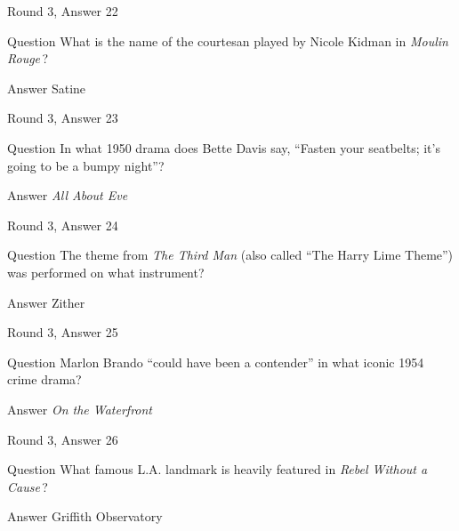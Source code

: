 \documentclass[11pt]{beamer}
\begin{document}
\begin{frame}[t]{Round 3, Answer 22}
\vspace{2em}
\begin{block}{Question}
What is the name of the courtesan played by Nicole Kidman in \emph{Moulin Rouge}\,?
\end{block}
\pause{}
\begin{block}{Answer}
Satine
\end{block}
\end{frame}
    

\begin{frame}[t]{Round 3, Answer 23}
\vspace{2em}
\begin{block}{Question}
In what 1950 drama does Bette Davis say, ``Fasten your seatbelts; it's going to be a bumpy night''?
\end{block}
\pause{}
\begin{block}{Answer}
\emph{All About Eve}
\end{block}
\end{frame}
    

\begin{frame}[t]{Round 3, Answer 24}
\vspace{2em}
\begin{block}{Question}
The theme from \emph{The Third Man} (also called ``The Harry Lime Theme'') was performed on what instrument?
\end{block}
\pause{}
\begin{block}{Answer}
Zither
\end{block}
\end{frame}
    

\begin{frame}[t]{Round 3, Answer 25}
\vspace{2em}
\begin{block}{Question}
Marlon Brando ``could have been a contender'' in what iconic 1954 crime drama?
\end{block}
\pause{}
\begin{block}{Answer}
\emph{On the Waterfront}
\end{block}
\end{frame}
    

\begin{frame}[t]{Round 3, Answer 26}
\vspace{2em}
\begin{block}{Question}
What famous L.A. landmark is heavily featured in \emph{Rebel Without a Cause}\,?
\end{block}
\pause{}
\begin{block}{Answer}
Griffith Observatory
\end{block}
\end{frame}
    
\end{document}
